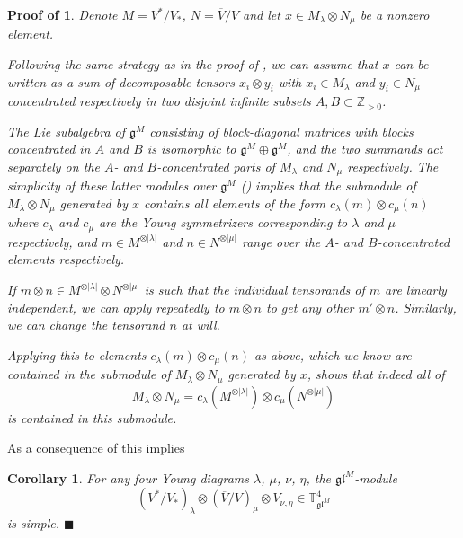 \documentclass[11pt]{article}
\theoremstyle{plain}
\newtheorem{corollary}[lemma]{Corollary}
\theoremstyle{nonumberplain}
\theoremstyle{plain}
\theoremstyle{nonumberplain}
\newtheorem{proof_of_simples}{Proof of \Cref{pr.simples}}
\newcommand\bT{{\mathbb T}}
\newcommand\fg{\mathfrak{g}}
\newcommand\fgl{\mathfrak{gl}}
\newcommand\ol{\overline}
\newcommand{\define}[1]{{\em #1}}
\newcommand{\qedhere}{\mbox{}\hfill\ensuremath{\blacksquare}}
\begin{document}
\begin{proof_of_simples}
  Denote $M=V^*/V_*$, $N=\ol{V}/V$ and let $x\in M_\lambda\otimes N_\mu$ be a nonzero element. 

Following the same strategy as in the proof of \cite[Proposition 1]{Chi14}, we can assume that $x$ can be written as a sum of decomposable tensors $x_i\otimes y_i$ with $x_i\in M_\lambda$ and $y_i\in N_\mu$ concentrated respectively in two disjoint infinite subsets $A, B \subset \mathbb{Z}_{>0}$. 

The Lie subalgebra of $\fg^M$ consisting of block-diagonal matrices with blocks concentrated in $A$ and $B$ is isomorphic to $\fg^M\oplus\fg^M$, and the two summands act separately on the $A$- and $B$-concentrated parts of $M_\lambda$ and $N_\mu$ respectively. The simplicity of these latter modules over $\fg^M$ (\cite[Proposition 1]{Chi14}) implies that the submodule of $M_\lambda\otimes N_\mu$ generated by $x$ contains all elements of the form $c_\lambda (m)\otimes c_\mu (n)$ where $c_\lambda$ and $c_\mu$ are the Young symmetrizers corresponding to $\lambda$ and $\mu$ respectively, and $m\in M^{\otimes |\lambda|}$ and $n\in N^{\otimes |\mu|}$ range over the $A$- and $B$-concentrated elements respectively. 

If $m\otimes n\in M^{\otimes|\lambda|}\otimes N^{\otimes|\mu|}$ is such that the individual tensorands of $m$ are linearly independent, we can apply  repeatedly to $m\otimes n$ to get any other $m'\otimes n$. Similarly, we can change the  tensorand $n$ at will. 

Applying this to elements $c_\lambda (m)\otimes c_\mu (n)$ as above, which we know are contained in the submodule of $M_\lambda\otimes N_\mu$ generated by $x$, shows that indeed \define{all} of 
\begin{equation*}
  M_\lambda\otimes N_\mu=c_\lambda (M^{\otimes|\lambda|})\otimes c_\mu (N^{\otimes|\mu|})
\end{equation*}
is contained in this submodule. 
\end{proof_of_simples}


As a consequence of \cite[Lemma 3]{Chi14} this implies


\begin{corollary}\label{cor.4diag_aux}
  For any four Young diagrams $\lambda$, $\mu$, $\nu$, $\eta$, the $\fgl^M$-module
  \begin{equation*}
    (V^*/V_*)_\lambda\otimes\left(\ol{V}/V\right)_\mu\otimes V_{\nu,\eta} \in \bT^4_{\fgl^M}
  \end{equation*}
is simple.
\qedhere
\end{corollary}
\end{document}
